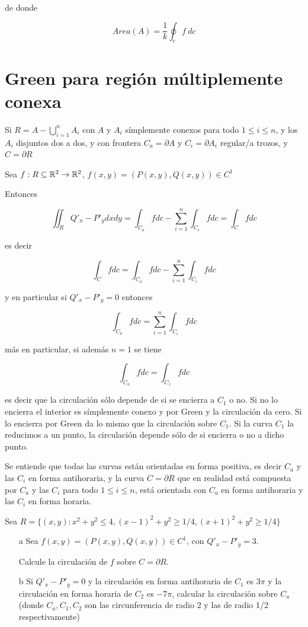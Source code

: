 de donde

$$ Area(A) = \frac{1}{k} \oint_c f \ dc $$

\section{Green para región múltiplemente conexa}

Si $R = A - \bigcup_{i=1}^n A_i $ con $A$ y $A_i$ símplemente conexos para todo $1 \leq i \leq n$, y los $A_i$ disjuntos dos a dos, y con frontera $C_a = \partial A$ y $C_i = \partial A_i$ regular/a trozos, y $C = \partial R$

Sea $f : R \subseteq \mathbb{R}^2 \to \mathbb{R}^2$, $f(x,y) = (P(x,y), Q(x,y)) \in C^1 $

Entonces

$$ \iint_R Q'_x - P'_y dxdy = \int_{C_a} f dc - \sum_{i=1}^n \int_{C_i} f dc = \int_C f dc $$

es decir

$$\int_C f dc = \int_{C_a} f dc - \sum_{i=1}^n \int_{C_i} f dc $$

y en particular si $Q'_x - P'_y = 0$ entonces

$$ \int_{C_a} f dc = \sum_{i=1}^n \int_{C_i} f dc $$

más en particular, si además $n=1$ se tiene

$$ \int_{C_a} f dc = \int_{C_1} f dc $$

es decir que la circulación sólo depende de si se encierra a $C_1$ o no.  Si no lo encierra el interior es símplemente conexo y por Green y la circulación da cero.  Si lo encierra por Green da lo mismo que la circulación sobre $C_1$.  Si la curva $C_1$ la reducimos a un punto, la circulación depende sólo de si encierra o no a dicho punto.

Se entiende que todas las curvas están orientadas en forma positiva, es decir $C_a$ y las $C_i$ en forma antihoraria, y la curva $C = \partial R$ que en realidad está compuesta por $C_a$ y las $C_i$ para todo $1 \leq i \leq n$, está orientada con $C_a$ en forma antihoraria y las $C_i$ en forma horaria.

\begin{example}
Sea $R = \{ (x,y) : x^2 + y^2 \leq 4, (x-1)^2 + y^2 \geq 1/4, (x+1)^2 + y^2 \geq 1/4 \}$

\begin{itemize}
\item[a] Sea $f(x,y) = (P(x,y), Q(x,y)) \in C^1$, con $Q'_x - P'_y = 3$.

Calcule la circulación de $f$ sobre $C = \partial R$.

\item[b] Si $Q'_x - P'_y = 0$ y la circulación en forma antihoraria de $C_1$ es $3\pi$ y la circulación en forma horaria de $C_2$ es $-7 \pi$, calcular la circulación sobre $C_a$ (donde $C_a, C_1, C_2$ son las circunferencia de radio 2 y las de radio 1/2 respectivamente)

\end{itemize}

\end{example}

